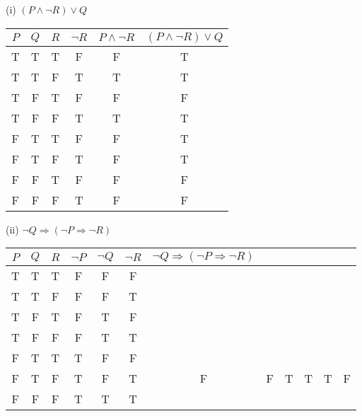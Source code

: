 \documentclass{article}
\begin{document}
(i) $(P \land \neg R) \lor Q$\\
\begin{tabular}{|c|c|c|c|c|c|}
    \hline
    $P$ & $Q$ & $R$ & $\neg R$ & $ P \land \neg R$ & $(P \land \neg R) \lor Q$ \\
    \hline
    T   & T   & T   & F        & F                 & T                         \\
    T   & T   & F   & T        & T                 & T                         \\
    T   & F   & T   & F        & F                 & F                         \\
    T   & F   & F   & T        & T                 & T                         \\
    F   & T   & T   & F        & F                 & T                         \\
    F   & T   & F   & T        & F                 & T                         \\
    F   & F   & T   & F        & F                 & F                         \\
    F   & F   & F   & T        & F                 & F                         \\
    \hline
\end{tabular}

(ii) $\neg Q \Rightarrow (\neg P \Rightarrow \neg R)$\\
\begin{tabular}{|c|c|c|c|c|c|c|c|}
    \hline
    $P$ & $Q$ & $R$ & $\neg P $ & $\neg Q$ & $\neg R$ & $\neg Q \Rightarrow (\neg P \Rightarrow \neg R)$ \\
    \hline
    T   & T   & T   & F         & F        & F        &                                                  \\
    T   & T   & F   & F         & F        & T        &                                                  \\
    T   & F   & T   & F         & T        & F        &                                                  \\
    T   & F   & F   & F         & T        & T        &                                                  \\
    F   & T   & T   & T         & F        & F        &                                                  \\
    F   & T   & F   & T         & F        & T        &
    F   & F   & T   & T         & T        & F        &                                                  \\
    F   & F   & F   & T         & T        & T        &                                                  \\
    \hline
\end{tabular}
\end{document}
